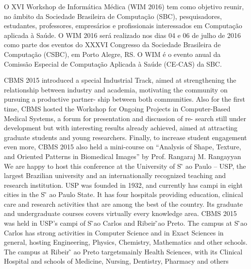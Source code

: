 O XVI Workshop de Informática Médica (WIM 2016) tem como objetivo reunir, no âmbito da Sociedade Brasileira de Computação (SBC), pesquisadores, estudantes, professores, empresários e profissionais interessados em Computação aplicada à Saúde. O WIM 2016 será realizado nos dias 04 e 06 de julho de 2016 como parte dos eventos do XXXVI Congresso da Sociedade Brasileira de Computação (CSBC), em Porto Alegre, RS. O WIM é o evento anual da Comissão Especial de Computação Aplicada à Saúde (CE-CAS) da SBC.~\cite{wim2016}


CBMS 2015 introduced a special Industrial Track, aimed at strengthening the relationship
between industry and academia, motivating the community on pursuing a productive partner-
ship between both communities. Also for the first time, CBMS hosted the Workshop for Ongoing
Projects in Computer-Based Medical Systems, a forum for presentation and discussion of re-
search still under development but with interesting results already achieved, aimed at attracting
graduate students and young researchers. Finally, to increase student engagement even more,
CBMS 2015 also held a mini-course on “Analysis of Shape, Texture, and Oriented Patterns in
Biomedical Images” by Prof. Rangaraj M. Rangayyan~\cite{cbms2016}
We are happy to host this conference at the University of S ̃
ao Paulo – USP, the largest
Brazilian university and an internationally recognized teaching and research institution. USP
was founded in 1932, and currently has campi in eight cities in the S ̃
ao Paulo State. It has four
hospitals providing education, clinical care and research activities that are among the best of the
country. Its graduate and undergraduate courses covers virtually every knowledge area. CBMS
2015 was held in USP’s campi of S ̃ao Carlos and Ribeir ̃ao Preto. The campus at S ̃ao Carlos
has strong activities in Computer Science and in Exact Sciences in general, hosting Engineering,
Physics, Chemistry, Mathematics and other schools.  The campus at Ribeir ̃
ao Preto targetsmainly Health Sciences, with its Clinical Hospital and schools of Medicine, Nursing, Dentistry, Pharmacy and others~\cite{cbms2016}

